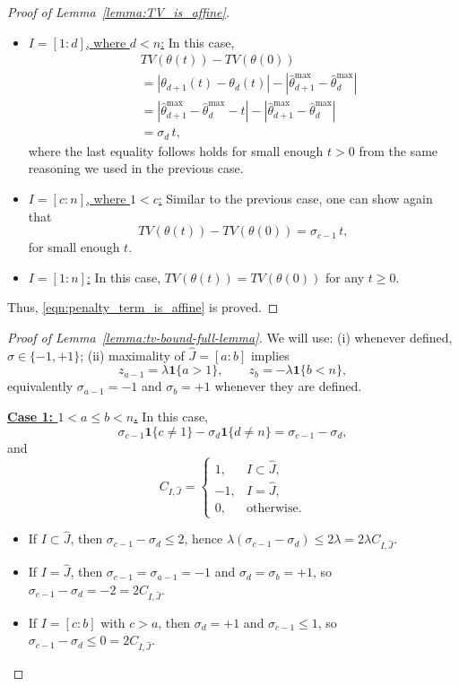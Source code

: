 \documentclass[11pt]{article}
\newcommand{\one}{\mathbf 1}
\theoremstyle{plain}
\theoremstyle{definition}
\theoremstyle{remark}
\begin{document}
\begin{appendix}
\begin{proof}[Proof of Lemma~\ref{lemma:TV_is_affine}]
\begin{itemize}
   \item \underline{$I=[1:d]$, where $d<n$:} In this case, 
   \begin{align*}
        &TV(\theta(t))-TV(\theta(0))\\
        &=|\theta_{d+1}(t)-\theta_d(t)|-|\hat{\theta}^{\max}_{d+1}-\hat{\theta}^{\max}_d|\\
        &=|\hat\theta^{\max}_{d+1}-\hat\theta^{\max}_d-t|-|\hat{\theta}^{\max}_{d+1}-\hat{\theta}^{\max}_d|\\
        &=\sigma_d\,t,
    \end{align*}
    where the last equality follows holds for small enough $t>0$ from the same reasoning we used in the previous case.
    \item \underline{$I=[c:n]$, where $1<c$:} Similar to the previous case, one can show again that
    \[TV(\theta(t))-TV(\theta(0))=\sigma_{c-1}\,t,\]
    for small enough $t$.
    \item \underline{$I=[1:n]$:} In this case, \(TV(\theta(t))=TV(\theta(0))\) for any $t\geq 0$.
\end{itemize}
Thus, \eqref{eqn:penalty_term_is_affine} is proved.
\end{proof}
\begin{proof}[Proof of Lemma~\ref{lemma:tv-bound-full-lemma}]
We will use:
(i) whenever defined, $\sigma\in\{-1,+1\}$;
(ii) maximality of $\hat{J}=[a:b]$ implies
\[
z_{a-1}=\lambda\one \{a>1\},
\qquad
z_b=-\lambda\one \{b<n\},
\]
equivalently $\sigma_{a-1}=-1$ and $\sigma_b=+1$ whenever they are defined. 

\medskip
\noindent\underline{\textbf{Case 1: $1<a\le b<n$.}}
In this case,
\[\sigma_{c-1}\one\{c\neq 1\}-\sigma_d\one\{d\neq n\}=\sigma_{c-1}-\sigma_d,\]
and
\[
C_{I,\hat J}=
\begin{cases}
1,& I\subset \hat J,\\
-1,& I=\hat J,\\
0,& \text{otherwise}.
\end{cases}
\]

\begin{itemize}
\item If $I\subset \hat J$, then $\sigma_{c-1}-\sigma_d\le 2$, hence
$\lambda(\sigma_{c-1}-\sigma_d)\le 2\lambda=2\lambda C_{I,\hat J}$.

\item If $I=\hat J$, then $\sigma_{c-1}=\sigma_{a-1}=-1$ and $\sigma_d=\sigma_b=+1$,
so $\sigma_{c-1}-\sigma_d=-2=2C_{I,\hat J}$.

\item If $I=[c:b]$ with $c>a$, then $\sigma_d=+1$ and $\sigma_{c-1}\le 1$,
so $\sigma_{c-1}-\sigma_d\le 0=2C_{I,\hat J}$.


\end{itemize}
\end{proof}
\end{appendix}
\end{document}
